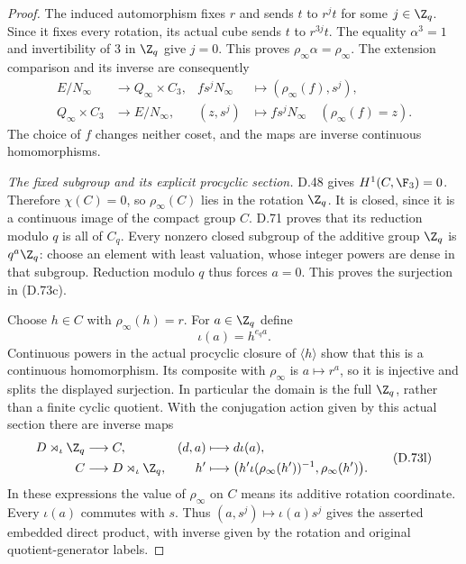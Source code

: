 \begin{proof}
The induced automorphism fixes \(r\) and sends \(t\)
to \(r^j t\) for some \(j\in\Z_q\). Since it fixes every
rotation, its actual cube sends \(t\) to \(r^{3j}t\).
The equality \(\alpha^3=1\) and invertibility of \(3\)
in \(\Z_q\) give \(j=0\). This proves
\(\rho_\infty\alpha=\rho_\infty\).
The extension comparison and its inverse are consequently
\[
 \begin{aligned}
 E/N_\infty&\longrightarrow Q_\infty\times C_3,
       &fs^jN_\infty&\longmapsto(\rho_\infty(f),s^j),\\
 Q_\infty\times C_3&\longrightarrow E/N_\infty,
       &(z,s^j)&\longmapsto fs^jN_\infty
                       \quad(\rho_\infty(f)=z).
 \end{aligned}                                                 \tag{D.73j}
\]
The choice of \(f\) changes neither coset, and the maps
are inverse continuous homomorphisms.

\emph{The fixed subgroup and its explicit procyclic section.}
D.48 gives \(H^1(C,\F_3)=0\). Therefore
\(\chi(C)=0\), so \(\rho_\infty(C)\) lies in the rotation
\(\Z_q\). It is closed, since it is a continuous image
of the compact group \(C\). D.71 proves that its
reduction modulo \(q\) is all of \(C_q\).
Every nonzero closed subgroup of the additive group
\(\Z_q\) is \(q^a\Z_q\): choose an element with least
valuation, whose integer powers are dense in that
subgroup. Reduction modulo \(q\) thus forces \(a=0\).
This proves the surjection in (D.73c).

Choose \(h\in C\) with \(\rho_\infty(h)=r\).
For \(a\in\Z_q\) define
\[
                 \iota(a)=h^{e_q a}.
                                                               \tag{D.73k}
\]
Continuous powers in the actual procyclic closure of
\(\langle h\rangle\) show that this is a continuous
homomorphism. Its composite with \(\rho_\infty\) is
\(a\mapsto r^a\), so it is injective and splits the
displayed surjection. In particular the domain is the
full \(\Z_q\), rather than a finite cyclic quotient.
With the conjugation action given by this actual
section there are inverse maps
\[
 \begin{aligned}
 D\rtimes_\iota\Z_q&\longrightarrow C,
                   &(d,a)&\longmapsto d\iota(a),\\
 C&\longrightarrow D\rtimes_\iota\Z_q,
                   &h'&\longmapsto
          \bigl(h'\iota(\rho_\infty(h'))^{-1},
                        \rho_\infty(h')\bigr).
 \end{aligned}                                                 \tag{D.73l}
\]
In these expressions the value of \(\rho_\infty\) on \(C\)
means its additive rotation coordinate.
Every \(\iota(a)\) commutes with \(s\).
Thus \((a,s^j)\mapsto\iota(a)s^j\) gives the asserted
embedded direct product, with inverse given by the
rotation and original quotient-generator labels.


\end{proof}
